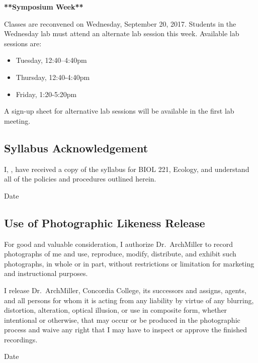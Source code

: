 \documentclass{tufte-handout}
\begin{document}
\begin{fullwidth}

\textbf{**Symposium Week**} 											%

Classes are reconvened on Wednesday, September 20, 2017. Students in the Wednesday lab must attend an alternate lab session this week. Available lab sessions are:
\begin{itemize}
	\item Tuesday, 12:40--4:40pm
	\item Thursday, 12:40-4:40pm
	\item Friday, 1:20-5:20pm
\end{itemize}
A sign-up sheet for alternative lab sessions will be available in the first lab meeting.

\end{fullwidth}

\newpage

\subsection{Syllabus Acknowledgement}

I, \underline{\hspace{5cm}}, have received a copy of the syllabus for BIOL 221, Ecology, and understand all of the policies and procedures outlined herein. 

  \underline{\hspace{5cm}} {Date}  \hrulefill


\subsection{Use of Photographic Likeness Release}

For good and valuable consideration, I authorize Dr.~ArchMiller to record photographs of me and use, reproduce, modify, distribute, and exhibit such photographs, in whole or in part, without restrictions or limitation for marketing and instructional purposes. 

I release Dr.~ArchMiller, Concordia College, its successors and assigns, agents, and all persons for whom it is acting from any liability by virtue of any blurring, distortion, alteration, optical illusion, or use in composite form, whether intentional or otherwise, that may occur or be produced in the photographic process and waive any right that I may have to inspect or approve the finished recordings.

  \hrulefill
{}  \underline{\hspace{5cm}} {Date}  \hrulefill
\end{document}
